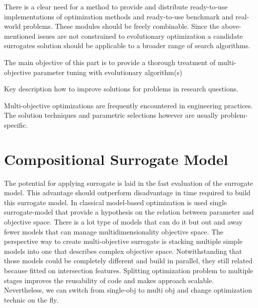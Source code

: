     There is a clear need for a method to provide and distribute ready-to-use implementations of optimization methods and ready-to-use benchmark and real-world problems. 
    These modules should be freely combinable. Since the above- mentioned issues are not constrained to evolutionary optimization a candidate surrogates solution should be applicable to a broader range of search algorithms.

    The main objective of this part is to provide a thorough treatment of multi-objective parameter tuning with evolutionary algorithm(s)

    Key description how to improve solutions for problems in research questions.

    Multi-objective optimizations are frequently encountered in engineering practices. The solution techniques and parametric selections however are usually problem-specific. \cite{abs181207958}

    \section{Compositional Surrogate Model}

        The potential for applying surrogate is laid in the fast evaluation of the surrogate model. This advantage should outperform disadvantage in time required to build this surrogate model. In classical model-based optimization is used single surrogate-model that provide a hypothesis on the relation between parameter and objective space. There is a lot type of models that can do it but out and away fewer models that can manage multidimensionality objective space. The perspective way to create multi-objective surrogate is stacking multiple simple models into one that describes complex objective space. Notwithstanding that those models could be completely different and build in parallel, they still related because fitted on intersection features.
        Splitting optimization problem to multiple stages improves the reusability of code and makes approach scalable. Nevertheless, we can switch from single-obj to multi obj and change optimization technic on the fly.

